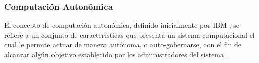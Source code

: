 \documentclass[12pt]{article}
\begin{document}
    



    




    \subsubsection{Computación Autonómica}
    

    El concepto de computación autonómica, definido inicialmente por IBM \citeyear{horn_2001}, se refiere a un conjunto de características que presenta un sistema computacional el cual le permite actuar de manera autónoma, o auto-gobernarse, con el fin de alcanzar algún objetivo establecido por los administradores del sistema \cite{lalanda_diaconescu_mccann_2014}.
\end{document}
